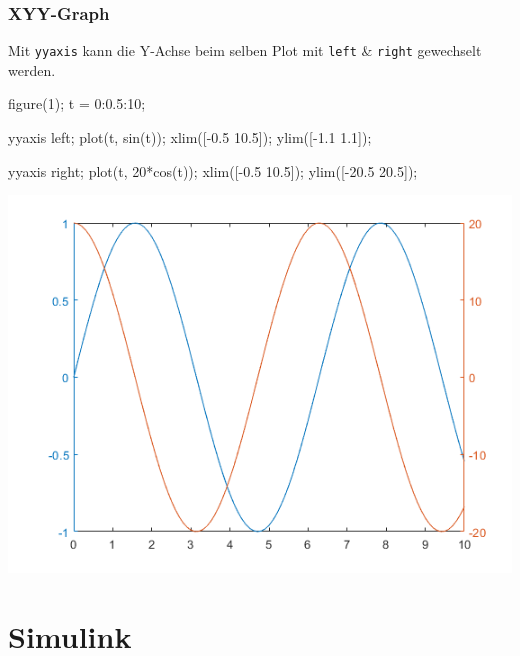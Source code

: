 \documentclass[
  10pt,
  a4paper,
  german]{article}
\newenvironment{Shaded}{}{}
\newcommand{\FloatTok}[1]{\textcolor[rgb]{0.00,0.36,0.77}{#1}}
\newcommand{\NormalTok}[1]{\textcolor[rgb]{0.14,0.16,0.18}{#1}}
\newcommand{\OperatorTok}[1]{\textcolor[rgb]{0.14,0.16,0.18}{#1}}
\newcommand{\VariableTok}[1]{\textcolor[rgb]{0.89,0.38,0.04}{#1}}
\numberwithin{equation}{section}
\begin{document}
\begin{multicols}{2}
\hypertarget{xyy-graph}{%
\subsubsection{XYY-Graph}\label{xyy-graph}}

Mit \texttt{yyaxis} kann die Y-Achse beim selben Plot mit \texttt{left}
\& \texttt{right} gewechselt werden.

\begin{Shaded}
\begin{Highlighting}[]
\VariableTok{figure}\NormalTok{(}\FloatTok{1}\NormalTok{)}\OperatorTok{;}
\VariableTok{t} \OperatorTok{=} \FloatTok{0}\OperatorTok{:}\FloatTok{0.5}\OperatorTok{:}\FloatTok{10}\OperatorTok{;}

\VariableTok{yyaxis} \VariableTok{left}\OperatorTok{;}
\VariableTok{plot}\NormalTok{(}\VariableTok{t}\OperatorTok{,} \VariableTok{sin}\NormalTok{(}\VariableTok{t}\NormalTok{))}\OperatorTok{;}
\VariableTok{xlim}\NormalTok{([}\OperatorTok{{-}}\FloatTok{0.5} \FloatTok{10.5}\NormalTok{])}\OperatorTok{;}
\VariableTok{ylim}\NormalTok{([}\OperatorTok{{-}}\FloatTok{1.1} \FloatTok{1.1}\NormalTok{])}\OperatorTok{;}

\VariableTok{yyaxis} \VariableTok{right}\OperatorTok{;}
\VariableTok{plot}\NormalTok{(}\VariableTok{t}\OperatorTok{,} \FloatTok{20}\OperatorTok{*}\VariableTok{cos}\NormalTok{(}\VariableTok{t}\NormalTok{))}\OperatorTok{;}
\VariableTok{xlim}\NormalTok{([}\OperatorTok{{-}}\FloatTok{0.5} \FloatTok{10.5}\NormalTok{])}\OperatorTok{;}
\VariableTok{ylim}\NormalTok{([}\OperatorTok{{-}}\FloatTok{20.5} \FloatTok{20.5}\NormalTok{])}\OperatorTok{;}
\end{Highlighting}
\end{Shaded}

\includegraphics{images/plotyy.png}

\hypertarget{simulink}{%
\section{Simulink}\label{simulink}}

\end{multicols}
\end{document}
